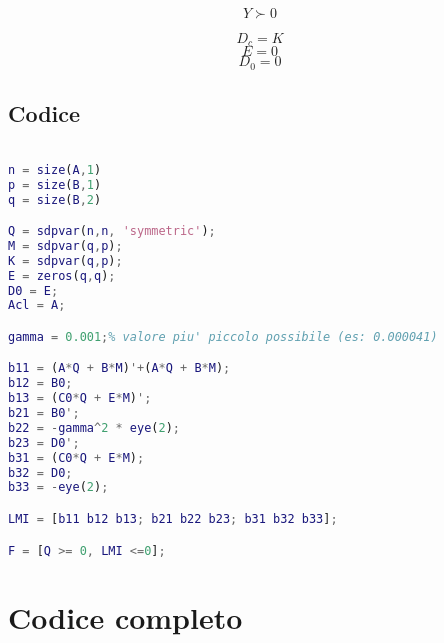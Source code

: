 \documentclass{article}
\begin{document}
\begin{equation}
Y \succ 0
\end{equation}

$$D_c = K$$
$$E = 0$$
$$D_0 = 0$$


\subsection{Codice}


\begin{lstlisting}[language=Matlab]

n = size(A,1)
p = size(B,1)
q = size(B,2)

Q = sdpvar(n,n, 'symmetric');
M = sdpvar(q,p);
K = sdpvar(q,p);
E = zeros(q,q);
D0 = E;
Acl = A;

gamma = 0.001;% valore piu' piccolo possibile (es: 0.000041)

b11 = (A*Q + B*M)'+(A*Q + B*M);
b12 = B0;
b13 = (C0*Q + E*M)';
b21 = B0';
b22 = -gamma^2 * eye(2);
b23 = D0';
b31 = (C0*Q + E*M);
b32 = D0;
b33 = -eye(2);

LMI = [b11 b12 b13; b21 b22 b23; b31 b32 b33];

F = [Q >= 0, LMI <=0];


\end{lstlisting}


\section{Codice completo}
\end{document}
